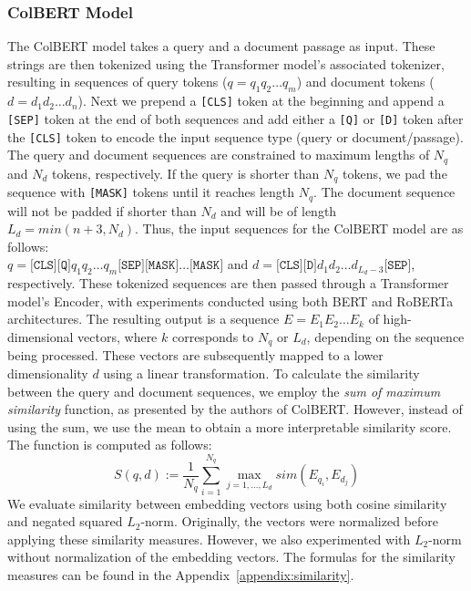 \documentclass[11pt]{article}
\begin{document}
\subsubsection{ColBERT Model}
The ColBERT model takes a query and a document passage as input. These strings are then tokenized using the Transformer model's associated tokenizer, resulting in sequences of query tokens ($q = q_1q_2\dots q_m$) and document tokens ($d = d_1d_2\dots d_n$). Next we prepend a \texttt{[CLS]} token at the beginning and append a \texttt{[SEP]} token at the end of both sequences and add either a \texttt{[Q]} or \texttt{[D]} token after the \texttt{[CLS]} token to encode the input sequence type (query or document/passage). The query and document sequences are constrained to maximum lengths of $N_q$ and $N_d$ tokens, respectively. If the query is shorter than $N_q$ tokens, we pad the sequence with \texttt{[MASK]} tokens until it reaches length $N_q$. The document sequence will not be padded if shorter than $N_d$ and will be of length $L_d = min(n + 3, N_d)$. Thus, the input sequences for the ColBERT model are as follows: \\ $q = \texttt{[CLS]}\texttt{[Q]}q_1q_2 \dots q_m\texttt{[SEP]}\texttt{[MASK]}\dots\texttt{[MASK]}$ and $d = \texttt{[CLS]}\texttt{[D]}d_1d_2 \dots d_{L_d-3}\texttt{[SEP]}$, respectively. These tokenized sequences are then passed through a Transformer model's Encoder, with experiments conducted using both BERT \cite{devlin2019bert} and RoBERTa \cite{liu2019roberta} architectures. The resulting output is a sequence $E = E_1E_2 \dots E_k$ of high-dimensional vectors, where $k$ corresponds to $N_q$ or $L_d$, depending on the sequence being processed. These vectors are subsequently mapped to a lower dimensionality $d$ using a linear transformation. To calculate the similarity between the query and document sequences, we employ the \textit{sum of maximum similarity} function, as presented by the authors of ColBERT. However, instead of using the sum, we use the mean to obtain a more interpretable similarity score. The function is computed as follows:
\[ S(q,d) := \frac{1}{N_q} \sum_{i=1}^{N_q} \max_{j = 1, \dots, L_d} sim(E_{q_i}, E_{d_j})
\]
We evaluate similarity between embedding vectors using both cosine similarity and negated squared $L_2$-norm.
Originally, the vectors were normalized before applying these similarity measures. However, we also experimented with $L_2$-norm without normalization of the embedding vectors.
The formulas for the similarity measures can be found in the Appendix~\ref{appendix:similarity}. 
\end{document}
